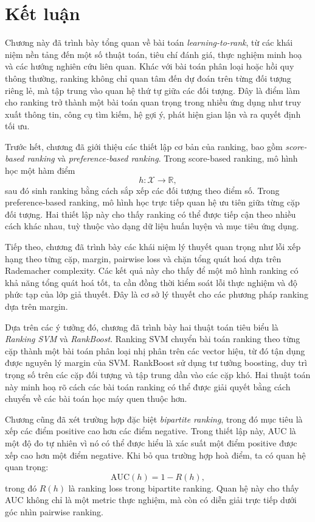 \section{Kết luận}

Chương này đã trình bày tổng quan về bài toán \textit{learning-to-rank}, từ các khái niệm nền tảng đến một số thuật toán, tiêu chí đánh giá, thực nghiệm minh hoạ và các hướng nghiên cứu liên quan. Khác với bài toán phân loại hoặc hồi quy thông thường, ranking không chỉ quan tâm đến dự đoán trên từng đối tượng riêng lẻ, mà tập trung vào quan hệ thứ tự giữa các đối tượng. Đây là điểm làm cho ranking trở thành một bài toán quan trọng trong nhiều ứng dụng như truy xuất thông tin, công cụ tìm kiếm, hệ gợi ý, phát hiện gian lận và ra quyết định tối ưu.

Trước hết, chương đã giới thiệu các thiết lập cơ bản của ranking, bao gồm \textit{score-based ranking} và \textit{preference-based ranking}. Trong score-based ranking, mô hình học một hàm điểm
\[
    h:\mathcal{X}\rightarrow\mathbb{R},
\]
sau đó sinh ranking bằng cách sắp xếp các đối tượng theo điểm số. Trong preference-based ranking, mô hình học trực tiếp quan hệ ưu tiên giữa từng cặp đối tượng. Hai thiết lập này cho thấy ranking có thể được tiếp cận theo nhiều cách khác nhau, tuỳ thuộc vào dạng dữ liệu huấn luyện và mục tiêu ứng dụng.

Tiếp theo, chương đã trình bày các khái niệm lý thuyết quan trọng như lỗi xếp hạng theo từng cặp, margin, pairwise loss và chặn tổng quát hoá dựa trên Rademacher complexity. Các kết quả này cho thấy để một mô hình ranking có khả năng tổng quát hoá tốt, ta cần đồng thời kiểm soát lỗi thực nghiệm và độ phức tạp của lớp giả thuyết. Đây là cơ sở lý thuyết cho các phương pháp ranking dựa trên margin.

Dựa trên các ý tưởng đó, chương đã trình bày hai thuật toán tiêu biểu là \textit{Ranking SVM} và \textit{RankBoost}. Ranking SVM chuyển bài toán ranking theo từng cặp thành một bài toán phân loại nhị phân trên các vector hiệu, từ đó tận dụng được nguyên lý margin của SVM. RankBoost sử dụng tư tưởng boosting, duy trì trọng số trên các cặp đối tượng và tập trung dần vào các cặp khó. Hai thuật toán này minh hoạ rõ cách các bài toán ranking có thể được giải quyết bằng cách chuyển về các bài toán học máy quen thuộc hơn.

Chương cũng đã xét trường hợp đặc biệt \textit{bipartite ranking}, trong đó mục tiêu là xếp các điểm positive cao hơn các điểm negative. Trong thiết lập này, AUC là một độ đo tự nhiên vì nó có thể được hiểu là xác suất một điểm positive được xếp cao hơn một điểm negative. Khi bỏ qua trường hợp hoà điểm, ta có quan hệ quan trọng:
\[
    \mathrm{AUC}(h)=1-R(h),
\]
trong đó \(R(h)\) là ranking loss trong bipartite ranking. Quan hệ này cho thấy AUC không chỉ là một metric thực nghiệm, mà còn có diễn giải trực tiếp dưới góc nhìn pairwise ranking.

